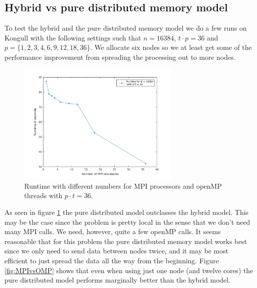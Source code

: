 \subsection*{Hybrid vs pure distributed memory model}
To test the hybrid and the pure distributed memory model we do a few runs on Kongull with the following settings such that $n = 16384$,  $t\cdot p = 36$ and $p = \{1, 2, 3, 4, 6, 9, 12, 18, 36\}$. We allocate six nodes so we at least get some of the performance improvement from spreading the processing out to more nodes.
\begin{figure}[h]
\centering
\includegraphics[width=0.7\textwidth]{./figures/pt36}
\caption{Runtime with different numbers for MPI processors and openMP threads with $p\cdot t = 36$.}
\label{fig:runtime}
\end{figure}
As seen in figure \ref{fig:runtime} the pure distributed model outclasses the hybrid model. This may be the case since the problem is pretty local in the sense that we don't need many MPI calls. We need, however, quite a few openMP calls. It seems reasonable that for this problem the pure distributed memory model works best since we only need to send data between nodes twice, and it may be most efficient to just spread the data all the way from the beginning. Figure \ref{fig:MPIvsOMP} shows that even when using just one node (and twelve cores) the pure distributed model performs marginally better than the hybrid model.


